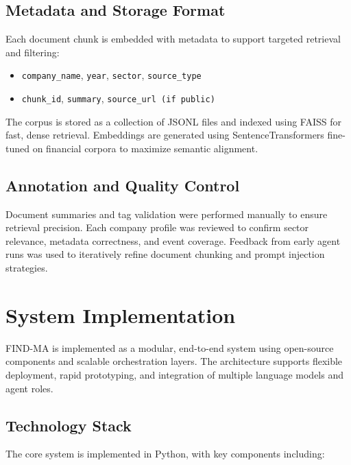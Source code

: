 \documentclass[11pt]{article}
\begin{document}
\subsection*{Metadata and Storage Format}

Each document chunk is embedded with metadata to support targeted retrieval and filtering:

\begin{itemize}
    \item \texttt{company\_name}, \texttt{year}, \texttt{sector}, \texttt{source\_type}
    \item \texttt{chunk\_id}, \texttt{summary}, \texttt{source\_url (if public)}
\end{itemize}

The corpus is stored as a collection of JSONL files and indexed using FAISS for fast, dense retrieval. Embeddings are generated using SentenceTransformers fine-tuned on financial corpora to maximize semantic alignment.

\subsection*{Annotation and Quality Control}

Document summaries and tag validation were performed manually to ensure retrieval precision. Each company profile was reviewed to confirm sector relevance, metadata correctness, and event coverage. Feedback from early agent runs was used to iteratively refine document chunking and prompt injection strategies.


\section{System Implementation}
\label{sec:implementation}

FIND-MA is implemented as a modular, end-to-end system using open-source components and scalable orchestration layers. The architecture supports flexible deployment, rapid prototyping, and integration of multiple language models and agent roles.

\subsection*{Technology Stack}

The core system is implemented in Python, with key components including:
\end{document}
